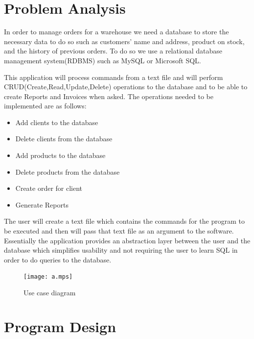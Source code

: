 \documentclass[10pt,a4paper]{article}
\begin{document}
\section{Problem Analysis}
In order to manage orders for a warehouse we need a database to store the necessary data to do so such as customers' name and address, product on stock, and the history of previous orders. To do so we use a relational database management system(RDBMS) such as MySQL or Microsoft SQL.\par
This application will process commands from a text file and will perform CRUD(Create,Read,Update,Delete) operations to the database and to be able to create Reports and Invoices when asked. The operations needed to be implemented are as follows:
\begin{itemize}
\item Add clients to the database
\item Delete clients from the database
\item Add products to the database
\item Delete products from the database
\item Create order for client
\item Generate Reports
\end{itemize}\par
The user will create a text file which contains the commands for the program to be executed and then will pass that text file as an argument to the software. Essentially the application provides an abstraction layer between the user and the database which simplifies usability and not requiring the user to learn SQL in order to do queries to the database.\par
\begin{figure}[!htb]

\centering
\texttt{[image: a.mps]}
\caption{Use case diagram}
\end{figure}

\section{Program Design}
\end{document}

